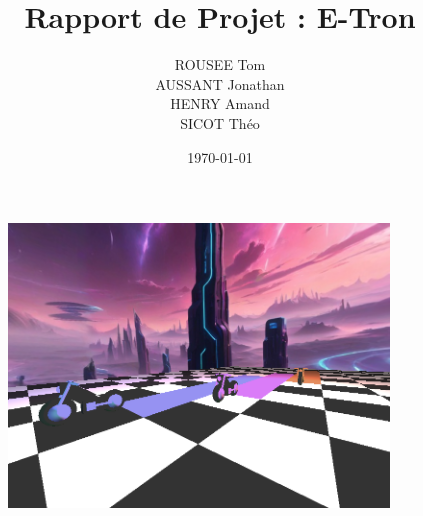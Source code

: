 \documentclass{myClass}
\title{Rapport de Projet : E-Tron}
\author{ROUSEE Tom \\ AUSSANT Jonathan \\ HENRY Amand \\ SICOT Théo}
\date{\today}
\begin{document}
\begin{figure}
	\centering
	
		\includegraphics[width=0.9\textwidth]{images/GraphicFinalGame.png}
	
	\label{fig:game}
\end{figure}

\maketitle

\pagebreak









\nocite{*}

 
\end{document}
